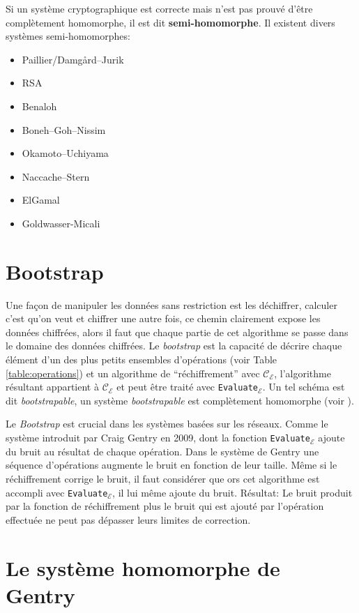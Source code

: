 Si un système cryptographique est correcte mais n'est pas prouvé d'être 
complètement homomorphe, il est dit {\bf semi-homomorphe}. Il existent divers systèmes semi-homomorphes:

\begin{itemize}
	\item Paillier/Damgård–Jurik
	\item RSA
	\item Benaloh
	\item Boneh–Goh–Nissim
	\item Okamoto–Uchiyama
	\item Naccache–Stern
	\item ElGamal
	\item Goldwasser-Micali
\end{itemize}

\section{Bootstrap}

Une façon de manipuler les données sans restriction est les déchiffrer, calculer c'est qu'on veut et 
chiffrer une autre fois, ce chemin clairement expose les données chiffrées, alors il faut que
chaque partie de cet algorithme se passe dans le domaine des données chiffrées. Le {\it bootstrap} est la 
capacité de décrire chaque élément d'un des plus petits ensembles d'opérations (voir Table \ref{table:operations}) 
et un algorithme de ``réchiffrement'' avec $\mathcal{C}_\mathcal{E}$,
l'algorithme résultant appartient à $\mathcal{C}_\mathcal{E}$ et peut être traité avec \verb!Evaluate!$_\mathcal{E}$.
Un tel schéma est dit {\it bootstrapable}, un système {\it bootstrapable} est complètement homomorphe (voir \cite{homenc}).

Le {\it Bootstrap} est crucial dans les systèmes basées sur les réseaux. Comme le système introduit par Craig Gentry 
en 2009, dont la fonction \verb!Evaluate!$_\mathcal{E}$ ajoute du bruit au résultat de chaque opération. 
Dans le système de Gentry une séquence d'opérations augmente le bruit en fonction de leur taille. Même si le ré\-chif\-fre\-ment corrige le bruit,
il faut considérer que ors cet algorithme est accompli avec \verb!Evaluate!$_\mathcal{E}$, il lui même ajoute  du  bruit. Résultat: Le bruit
produit par la fonction de ré\-chif\-fre\-ment plus le bruit qui est ajouté par l'opération effectuée ne peut pas 
dépasser leurs limites de correction.

\section{Le système homomorphe de Gentry}

